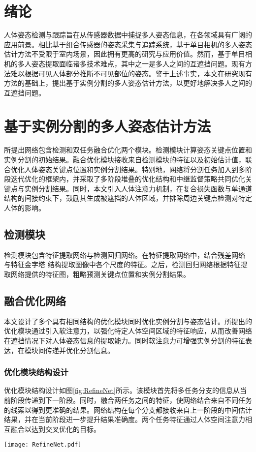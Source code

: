 \begin{outstandingabstract}
    \section{绪论}
	人体姿态检测与跟踪旨在从传感器数据中捕捉多人姿态信息，在各领域具有广阔的应用前景。相比基于组合传感器的姿态采集与追踪系统，基于单目相机的多人姿态估计方法不受限于室内场景，因此拥有更高的研究与应用价值。然而，基于单目相机的多人姿态提取面临诸多技术难点，其中之一是多人之间的互遮挡问题。现有方法难以根据可见人体部分推断不可见部位的姿态。鉴于上述事实，本文在研究现有方法的基础上，提出基于实例分割的多人姿态估计方法，以更好地解决多人之间的互遮挡问题。
	
	
    \section{基于实例分割的多人姿态估计方法}
	所提出网络包含检测和双任务融合优化两个模块。检测模块计算姿态关键点位置和实例分割的初始结果。融合优化模块接收来自检测模块的特征以及初始估计值，联合优化人体姿态关键点位置和实例分割结果。特别地，网络将分割任务加入到多阶段迭代优化的框架内，并采取了多阶段堆叠的优化结构和中继监督策略共同优化关键点与实例分割结果。同时，本文引入人体注意力机制，在复合损失函数与单通道结构的间接约束下，鼓励其生成被遮挡的人体区域，并排除周边关键点检测对特定人体的影响。

 	\subsection{检测模块} 
 	检测模块包含特征提取网络与检测回归网络。在特征提取网络中，结合残差网络\cite{He2015Deep} 与特征金字塔\cite{Lin2016Feature} 结构提取图像中各个尺度的特征。之后，检测回归网络根据特征提取网络提供的特征图，粗略预测关键点位置和实例分割结果。
 	
 	\subsection{融合优化网络}
 	本文设计了多个具有相同结构的优化模块同时优化实例分割与姿态估计。所提出的优化模块通过引入软注意力，以强化特定人体空间区域的特征响应，从而改善网络在遮挡情况下对人体姿态信息的提取能力。同时软注意力可增强实例分割的特征表达，在模块间传递并优化分割信息。
 	\subsubsection{优化模块结构设计}
 	优化模块结构设计如图\ref{fig:RefineNet}所示。该模块首先将多任务分支的信息从当前阶段传递到下一阶段。同时，融合两任务之间的特征，使网络结合来自不同任务的线索以得到更准确的结果。网络结构在每个分支都接收来自上一阶段的中间估计结果，并在当前阶段进一步提升结果准确度。两个任务特征通过人体空间注意力相互融合以达到交叉优化的目标。
 	\begin{figure*}[h]	
 		\centering
 		\texttt{[image: RefineNet.pdf]}
 		\caption{融合优化网络具体设计}
 		\label{fig:RefineNet}
 	\end{figure*}


\end{outstandingabstract}
